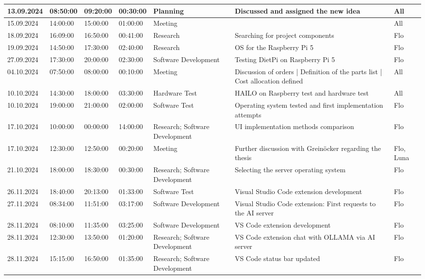 \begin{longtable}{@{}p{1.3cm} p{1cm} p{1cm} p{1cm} p{1.5cm} p{4.5cm} p{1.2cm}@{}}
    13.09.2024 & 08:50:00 & 09:20:00 & 00:30:00 & Planning & Discussed and assigned the new idea & All \\
    \hline
    15.09.2024 & 14:00:00 & 15:00:00 & 01:00:00 & Meeting & & All \\
    \hline
    18.09.2024 & 16:09:00 & 16:50:00 & 00:41:00 & Research & Searching for project components & Flo \\
    \hline
    19.09.2024 & 14:50:00 & 17:30:00 & 02:40:00 & Research & OS for the Raspberry Pi 5 & Flo \\
    \hline
    27.09.2024 & 17:30:00 & 20:00:00 & 02:30:00 & Software Development & Testing DietPi on Raspberry Pi 5 & Flo \\
    \hline
    04.10.2024 & 07:50:00 & 08:00:00 & 00:10:00 & Meeting & Discussion of orders | Definition of the parts list | Cost allocation defined & All \\
    \hline
    10.10.2024 & 14:30:00 & 18:00:00 & 03:30:00 & Hardware Test & HAILO on Raspberry test and hardware test & All\\
    \hline
    10.10.2024 & 19:00:00 & 21:00:00 & 02:00:00 & Software Test & Operating system tested and first implementation attempts & Flo \\
    \hline
    17.10.2024 & 10:00:00 & 00:00:00 & 14:00:00 & Research; Software Development & UI implementation methods comparison & Flo \\
    \hline
    17.10.2024 & 12:30:00 & 12:50:00 & 00:20:00 & Meeting & Further discussion with Greinöcker regarding the thesis & Flo, Luna \\
    \hline
    21.10.2024 & 18:00:00 & 18:30:00 & 00:30:00 & Research; Software Development & Selecting the server operating system & Flo \\
    \hline
    26.11.2024 & 18:40:00 & 20:13:00 & 01:33:00 & Software Test & Visual Studio Code extension development & Flo \\
    \hline
    27.11.2024 & 08:34:00 & 11:51:00 & 03:17:00 & Software Development & Visual Studio Code extension: First requests to the AI server & Flo \\
    \hline
    28.11.2024 & 08:10:00 & 11:35:00 & 03:25:00 & Software Development & VS Code extension development & Flo \\
    \hline
    28.11.2024 & 12:30:00 & 13:50:00 & 01:20:00 & Research; Software Development & VS Code extension chat with OLLAMA via AI server & Flo \\
    \hline
    28.11.2024 & 15:15:00 & 16:50:00 & 01:35:00 & Research; Software Development & VS Code status bar updated & Flo \\

\end{longtable}
